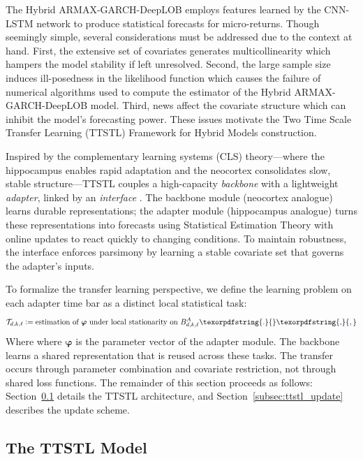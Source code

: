 \documentclass[10pt,a4paper,oneside]{article}
\providecommand{\DIFaddtex}[1]{{\protect\color{blue} \sf #1}} %
\providecommand{\DIFdeltex}[1]{{\protect\color{red} \scriptsize #1}} %
\providecommand{\DIFaddbegin}{} %
\providecommand{\DIFaddend}{} %
\providecommand{\DIFdelbegin}{} %
\providecommand{\DIFdelend}{} %
\providecommand{\DIFadd}[1]{\texorpdfstring{\DIFaddtex{#1}}{#1}} %
\providecommand{\DIFdel}[1]{\texorpdfstring{\DIFdeltex{#1}}{}} %
\newcommand{\DIFscaledelfig}{0.5}
\newlength{\DIFdelgraphicswidth} %
\newlength{\DIFdelgraphicsheight} %
\newcommand{\DIFaddincludegraphics}[2][]{{\color{blue}\fbox{\DIFOincludegraphics[#1]{#2}}}} %
\newcommand{\DIFdelincludegraphics}[2][]{%
\sbox{\DIFdelgraphicsbox}{\DIFOincludegraphics[#1]{#2}}%
\settoboxwidth{\DIFdelgraphicswidth}{\DIFdelgraphicsbox} %
\settoboxtotalheight{\DIFdelgraphicsheight}{\DIFdelgraphicsbox} %
\scalebox{\DIFscaledelfig}{%
\parbox[b]{\DIFdelgraphicswidth}{\usebox{\DIFdelgraphicsbox}\\[-\baselineskip] \rule{\DIFdelgraphicswidth}{0em}}\llap{\resizebox{\DIFdelgraphicswidth}{\DIFdelgraphicsheight}{%
\setlength{\unitlength}{\DIFdelgraphicswidth}%
\begin{picture}(1,1)%
\thicklines\linethickness{2pt} %
{\color[rgb]{1,0,0}\put(0,0){\framebox(1,1){}}}%
{\color[rgb]{1,0,0}\put(0,0){\line( 1,1){1}}}%
{\color[rgb]{1,0,0}\put(0,1){\line(1,-1){1}}}%
\end{picture}%
}\hspace*{3pt}}} %
} %
\DeclareRobustCommand{\DIFaddbegin}{\DIFOaddbegin \let\includegraphics\DIFaddincludegraphics} %
\DeclareRobustCommand{\DIFaddend}{\DIFOaddend \let\includegraphics\DIFOincludegraphics} %
\DeclareRobustCommand{\DIFdelbegin}{\DIFOdelbegin \let\includegraphics\DIFdelincludegraphics} %
\DeclareRobustCommand{\DIFdelend}{\DIFOaddend \let\includegraphics\DIFOincludegraphics} %
\begin{document}
The Hybrid ARMAX-GARCH-DeepLOB employs features learned by the CNN-LSTM network to produce statistical forecasts for micro-returns. Though seemingly simple, several considerations must be addressed due to the context at hand. First, the extensive set of covariates generates multicollinearity which hampers the model stability if left unresolved. Second, the large sample size induces ill-posedness in the likelihood function which causes the failure of numerical algorithms used to compute the estimator of the Hybrid ARMAX-GARCH-DeepLOB model. Third, news affect the covariate structure which can inhibit the model's forecasting power. These issues motivate the Two Time Scale Transfer Learning (TTSTL) Framework for Hybrid Models construction.

Inspired by the complementary learning systems (CLS) theory—where the hippocampus enables rapid adaptation and the neocortex consolidates slow, stable structure—TTSTL couples a high-capacity \emph{backbone} with a lightweight \emph{adapter}, linked by an \emph{interface} \cite{pham_continual_2024}. The backbone module (neocortex analogue) learns durable representations; the adapter module (hippocampus analogue) turns these representations into forecasts using Statistical Estimation Theory with online updates to react quickly to changing conditions. To maintain robustness, the interface enforces parsimony by learning a stable covariate set that governs the adapter’s inputs.

To formalize the transfer learning perspective, we define the learning problem on each adapter time bar as a distinct local statistical task:
\[
\mathcal{T}_{d,k,\ell} := \text{estimation of } \boldsymbol{\varphi} \text{ under local stationarity on } B^A_{d,k,\ell}\DIFdelbegin \DIFdel{.
}\DIFdelend \DIFaddbegin \DIFadd{,
}\DIFaddend \]
\DIFdelbegin \DIFdel{Where }\DIFdelend \DIFaddbegin \DIFadd{where }\DIFaddend $\boldsymbol{\varphi}$ is the parameter vector of the adapter module. The backbone learns a shared representation that is reused across these tasks. The transfer occurs through parameter combination and covariate restriction, not through shared loss functions. The remainder of this section proceeds as follows: Section~\ref{subsec:ttstl_model} details the TTSTL architecture, and Section~\ref{subsec:ttstl_update} describes the update scheme.

\subsection{The TTSTL Model}
\label{subsec:ttstl_model}
\end{document}
